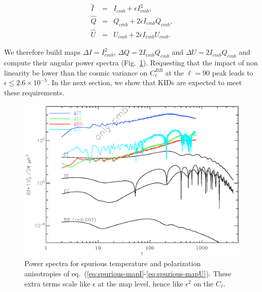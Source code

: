 \begin{eqnarray}
\hat{I} &=& I_{cmb} +  \epsilon I_{cmb}^2, \label{eq:spurious-mapI}\\
\hat{Q} &=& Q_{cmb} + 2\epsilon I_{cmb}Q_{cmb}, \label{eq:spurious-mapQ}\\
\hat{U} &=& U_{cmb} + 2\epsilon I_{cmb}U_{cmb} \label{eq:spurious-mapU}.
\end{eqnarray}

We therefore build maps $\Delta I = I_{cmb}^2$, $\Delta Q = 2I_{cmb}Q_{cmb}$ and
$\Delta U = 2I_{cmb}Q_{cmb}$ and compute their angular power spectra
(Fig.~\ref{fig:power_spectra}). Requesting that the impact of non linearity be
lower than the cosmic variance on $C^{BB}_\ell$ at the $\ell=90$ peak leads to
$\epsilon \leq 2.6\times 10^{-5}$. In the next section, we show that KIDs are expected
to meet these requirements.

\begin{figure}
\center
\includegraphics[clip,angle=0,width=\columnwidth]{Figures/cmb_power_spectra.eps}
\caption{Power spectra for spurious temperature and polarization anisotropies of
  eq.~(\ref{eq:spurious-mapI}-\ref{eq:spurious-mapU}). These extra terms scale
  like $\epsilon$ at the map level, hence like $\epsilon^2$ on the $C_\ell$.}
\label{fig:power_spectra}
\end{figure}
